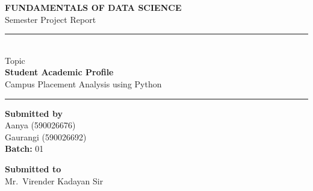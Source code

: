 \documentclass[12pt,a4paper]{article}
\begin{document}
\begin{titlepage}
\thispagestyle{empty}
\centering


\vspace*{1.5cm}

{\Large\bfseries\color{accent} FUNDAMENTALS OF DATA SCIENCE}\\[0.6cm]
{\large Semester Project Report}

\vspace{1.5cm}

\rule{\textwidth}{1.2pt}\\[0.5cm]
{\large Topic}\\[0.2cm]
{\Huge\bfseries Student Academic Profile}\\[0.3cm]
{\large Campus Placement Analysis using Python}\\[0.5cm]
\rule{\textwidth}{1.2pt}

\vfill

\begin{minipage}[t]{0.47\textwidth}
\raggedright
{\large\bfseries Submitted by}\\[0.3cm]
Aanya \hfill (590026676)\\[0.15cm]
Gaurangi \hfill (590026692)\\[0.4cm]
{\bfseries Batch:} 01
\end{minipage}
\hfill
\begin{minipage}[t]{0.47\textwidth}
\raggedleft
{\large\bfseries Submitted to}\\[0.3cm]
Mr.\ Virender Kadayan Sir
\end{minipage}

\vspace{2cm}
\end{titlepage}

\end{document}
